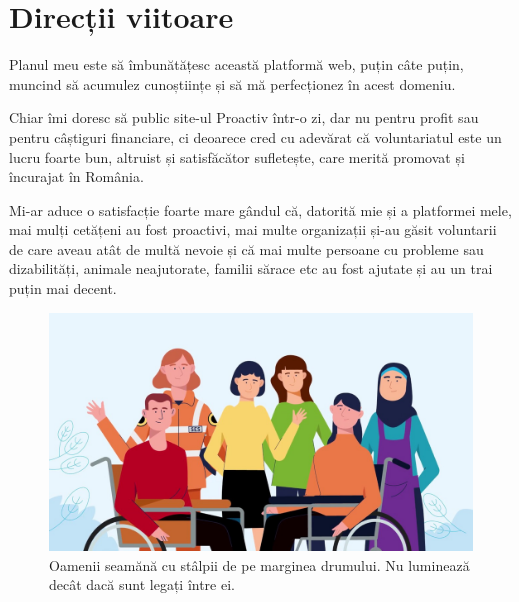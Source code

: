 \documentclass[12pt,a4paper]{report}
\begin{document}
\section{Direcții viitoare}
\par
Planul meu este să îmbunătățesc această platformă web, puțin câte puțin, muncind să acumulez cunoștiințe și să mă perfecționez în acest domeniu.
\\ \par
Chiar îmi doresc să public site-ul Proactiv într-o zi, dar nu pentru profit sau pentru câștiguri financiare, ci deoarece cred cu adevărat că voluntariatul este un lucru foarte bun, altruist și satisfăcător sufletește, care merită promovat și încurajat în România.
\\ \par
Mi-ar aduce o satisfacție foarte mare gândul că, datorită mie și a platformei mele, mai mulți cetățeni au fost proactivi, mai multe organizații și-au găsit voluntarii de care aveau atât de multă nevoie și că mai multe persoane cu probleme sau dizabilități, animale neajutorate, familii sărace etc au fost ajutate și au un trai puțin mai decent.
\\
\begin{figure}[H]
\centering
  \includegraphics[width=1\linewidth]{./imagini/theend.jpg}
  \caption{Oamenii seamănă cu stâlpii de pe marginea drumului. Nu luminează decât dacă sunt legați între ei.}
\end{figure}
\end{document}
